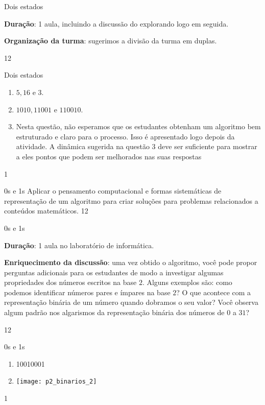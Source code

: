 \begin{sugestions}{Dois estados}
{
\textbf{Duração}: 1 aula, incluindo a discussão do explorando logo em seguida.

\textbf{Organização da turma}: sugerimos a divisão da turma em duplas.
}{1}{2}
\end{sugestions}
\begin{answer}{Dois estados}
{
\begin{enumerate}[left=1.5em]
\item $5, 16$ e $3$.

\item $1010, 11001 \text{ e } 110010$.

\item[\titem{c)} e \titem{d)}] Nesta questão, não esperamos que os estudantes obtenham um algoritmo bem estruturado e claro para o processo. Isso é apresentado logo depois da atividade. A dinâmica sugerida na questão 3 deve ser suficiente para mostrar a eles pontos que podem ser melhorados nas suas respostas
\end{enumerate}
}{1}
\end{answer}
\clearmargin
\clearmargin
\begin{objectives}{0s e 1s}
{
Aplicar o pensamento computacional e formas sistemáticas de representação de um algoritmo para criar soluções para problemas relacionados a conteúdos matemáticos.
}{1}{2}
\end{objectives}
\begin{sugestions}{0s e 1s}
{
\textbf{Duração}: 1 aula no laboratório de informática.

\textbf{Enriquecimento da discussão}: uma vez obtido o algoritmo, você pode propor perguntas adicionais para os estudantes de modo a investigar algumas propriedades dos números escritos na base $2$. Alguns exemplos são: como podemos identificar números pares e ímpares na base $2$? O que acontece com a representação binária de um número quando dobramos o seu valor? Você observa algum padrão nos algarismos da representação binária dos números de $0$ a $31$?
}{1}{2}
\end{sugestions}
\begin{answer}{0s e 1s}
{
\begin{enumerate}
\item 10010001
\item {}
{
\texttt{[image: p2\_binarios\_2]}
}
\end{enumerate}
}{1}
\end{answer}
\label{comp-exp6}
